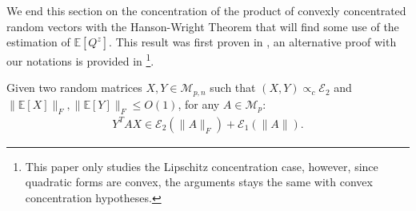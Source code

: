 \documentclass{ws-rmta}
\DeclareMathOperator{\tr}{Tr}
\begin{document}
We end this section on the concentration of the product of convexly concentrated random vectors with the Hanson-Wright Theorem that will find some use of the estimation of $\mathbb E[Q^z]$. This result was first proven in \cite{ADA14}, an alternative proof with our notations is provided in \cite[Proposition 8]{LOU21HV}\footnote{This paper only studies the Lipschitz concentration case, however, since quadratic forms are convex, the arguments stays the same with convex concentration hypotheses.}.
\begin{theorem}\label{the:hanson_wright}
  Given two random matrices $X,Y \in \mathcal{M}_{p,n}$ such that $(X,Y) \propto_c \mathcal E_2$ and $\|\mathbb E[X]\|_F,\|\mathbb E[Y]\|_F\leq O(1)$, for any $ A \in \mathcal{M}_{p}$:
  \begin{align*}
    Y^TAX \in \mathcal E_2(\|A\|_F) + \mathcal E_1(\|A\|).
  \end{align*}
\end{theorem}
\end{document}

